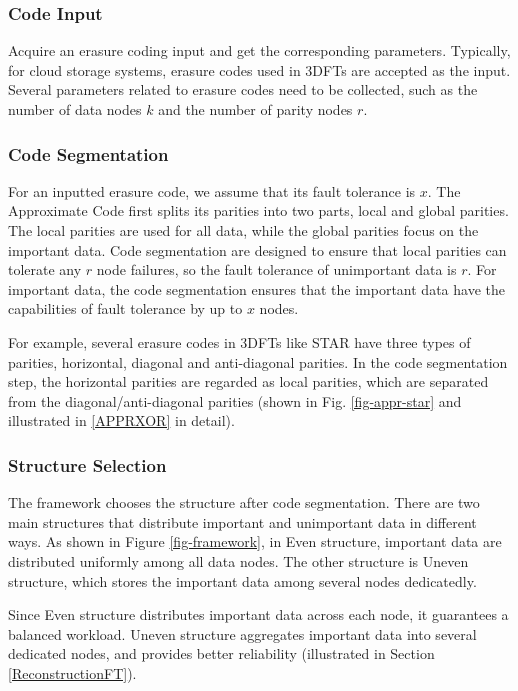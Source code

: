 \documentclass[sigconf]{acmart}
\begin{document}
\subsubsection{Code Input}
Acquire an erasure coding input and get the corresponding parameters. Typically, for cloud storage systems, erasure codes used in 3DFTs are accepted as the input. Several parameters related to erasure codes need to be collected, such as the number of data nodes $k$ and the number of parity nodes $r$.

\subsubsection{Code Segmentation}
For an inputted erasure code, we assume that its fault tolerance is $x$. The Approximate Code first splits its parities into two parts, local and global parities. The local parities are used for all data, while the global parities focus on the important data. Code segmentation are designed to ensure that local parities can tolerate any $r$ node failures, so the fault tolerance of unimportant data is $r$. For important data, the code segmentation ensures that the important data have the capabilities of fault tolerance by up to $x$ nodes.

For example, several erasure codes in 3DFTs like STAR have three types of parities, horizontal, diagonal and anti-diagonal parities. In the code segmentation step, the horizontal parities are regarded as local parities, which are separated from the diagonal/anti-diagonal parities (shown in Fig. \ref{fig-appr-star} and illustrated in \ref{APPRXOR} in detail).

\subsubsection{Structure Selection}
The framework chooses the structure after code segmentation.
There are two main structures that distribute important and unimportant data in different ways.
As shown in Figure \ref{fig-framework}, in Even structure, important data are distributed uniformly among all data nodes. The other structure is Uneven structure, which stores the important data among several nodes dedicatedly.

Since Even structure distributes important data across each node, it guarantees a balanced workload. Uneven structure aggregates important data into several dedicated nodes, and provides better reliability (illustrated in Section \ref{ReconstructionFT}).
\end{document}
